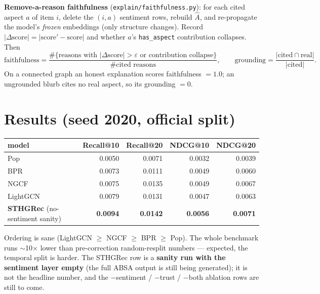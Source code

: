 \documentclass[10pt]{article}
\newcommand{\code}[1]{\texttt{\small #1}}
\newcommand{\Ahat}{\widehat{A}}
\begin{document}
\textbf{Remove-a-reason faithfulness} (\code{explain/faithfulness.py}): for each cited
aspect $a$ of item $i$, delete the $(i,a)$ sentiment rows, rebuild $\Ahat$, and
re-propagate the model's \emph{frozen} embeddings (only structure changes). Record
$|\Delta\text{score}| = |\text{score}' - \text{score}|$ and whether $a$'s
\code{has\_aspect} contribution collapses. Then
\[
\text{faithfulness} = \frac{\#\{\text{reasons with } |\Delta\text{score}| > \varepsilon \text{ or contribution collapse}\}}{\#\text{cited reasons}},
\qquad
\text{grounding} = \frac{|\text{cited} \cap \text{real}|}{|\text{cited}|}.
\]
On a connected graph an honest explanation scores faithfulness $=1.0$; an ungrounded blurb
cites no real aspect, so its grounding $=0$.

\section{Results (seed 2020, official split)}
\begin{center}\small
\begin{tabular}{lrrrr}
\toprule
model & Recall@10 & Recall@20 & NDCG@10 & NDCG@20 \\
\midrule
Pop      & 0.0050 & 0.0071 & 0.0032 & 0.0039 \\
BPR      & 0.0073 & 0.0111 & 0.0049 & 0.0060 \\
NGCF     & 0.0075 & 0.0135 & 0.0049 & 0.0067 \\
LightGCN & 0.0079 & 0.0131 & 0.0047 & 0.0063 \\
\textbf{STHGRec} (no-sentiment sanity) & \textbf{0.0094} & \textbf{0.0142} & \textbf{0.0056} & \textbf{0.0071} \\
\bottomrule
\end{tabular}
\end{center}
Ordering is sane (LightGCN $\ge$ NGCF $\ge$ BPR $\ge$ Pop). The whole benchmark runs
$\sim$10$\times$ lower than pre-correction random-resplit numbers --- expected, the
temporal split is harder. The STHGRec row is a \textbf{sanity run with the sentiment layer
empty} (the full ABSA output is still being generated); it is not the headline number, and
the $-$sentiment / $-$trust / $-$both ablation rows are still to come.
\end{document}
